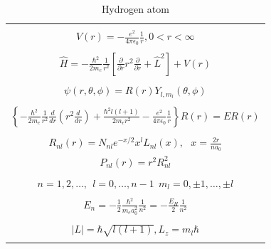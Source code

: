 \documentclass[11pt]{article}
\begin{document}
\begin{outline}
\begin{outline}
  \end{outline}
\begin{table}[tbh]
   \begin{center}
   \caption{Hydrogen atom}
    \label{Hydrogen atom}
\begin{tabular}[h]{|c|}
\hline
 \\
$\displaystyle       V(r) = -\frac{e^2}{4\pi\epsilon_0}\frac{1}{r}, 0 < r< \infty$ \\
 \\
$\displaystyle     \hat H = -\frac{\hbar^2}{2m_e}\frac{1}{r^2}\left [
  \frac{\partial}{\partial r}r^2\frac{\partial}{\partial r} + \hat L^2 \right ] +V(r)$ \\
\\
$\displaystyle \psi(r,\theta,\phi) = R(r)Y_{l,m_l}(\theta,\phi) $ \\
\\
$\displaystyle   \left \{ -\frac{\hbar^2}{2m_e}\frac{1}{r^2}
            \frac{d}{d r} \left ( r^2 \frac{d}{dr}\right ) + \frac{\hbar^2
              l(l+1)}{2 m_e r^2}
          -\frac{e^2}{4\pi\epsilon_0}\frac{1}{r}\right \} R(r) = E R(r) $ \\
\\
$\displaystyle R_{nl}(r) = N_{nl} e^{-x/2} x^l L_{nl}(x),\ \ \  x = \frac{2 r}{n a_0} $
\\
$\displaystyle P_{nl}(r) = r^2 R_{nl}^2 $
\\
\\
$\displaystyle n = 1, 2, \ldots,\ \  l = 0, \ldots, n-1 \ \ m_l = 0,\pm 1, \ldots, \pm l$
\\
\\
$\displaystyle     E_{n}=-\frac{1}{2}\frac{\hbar^2}{m_e a_0^2}\frac{1}{n^2} =-\frac{E_H}{2}\frac{1}{n^2}$ \\
 \\
$\displaystyle |L| = \hbar \sqrt{l(l+1)}, L_z = m_l \hbar $ \\
\\
\hline
\end{tabular}
 \end{center}
\end{table}


\end{outline}
\end{document}
